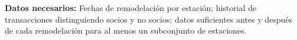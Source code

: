 \textbf{Datos necesarios:} Fechas de remodelación por estación; historial de transacciones distinguiendo socios y no socios; datos suficientes antes y después de cada remodelación para al menos un subconjunto de estaciones.



%
%
%

